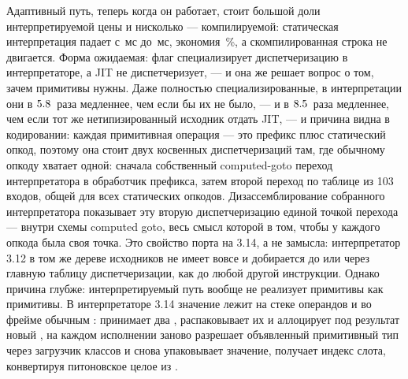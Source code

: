 Адаптивный путь, теперь когда он работает, стоит большой доли интерпретируемой цены и нисколько ---
компилируемой: статическая интерпретация падает с \,мс до \,мс, экономия \,\%, а
скомпилированная строка не двигается. Форма ожидаемая: флаг специализирует
диспетчеризацию в интерпретаторе, а JIT не диспетчеризует, --- и она же решает вопрос о том, зачем
примитивы нужны. Даже полностью специализированные, в интерпретации они в $\meas{ratio:b6_static-fork_static_adaptive:matmul96_int/fork_static_adaptive/static_interp|b6_static-fork_static_adaptive:matmul96_int/fork_static_adaptive/boxed_python}{5.8}$~раза медленнее,
чем если бы их не было, --- и в $\meas{ratio:b6_static-fork_static_adaptive:matmul96_int/fork_static_adaptive/static_interp|b6_static-fork_static_adaptive:matmul96_int/fork_static_adaptive/boxed_jit}{8.5}$~раза медленнее, чем если тот же нетипизированный исходник
отдать JIT, --- и причина видна в кодировании: каждая примитивная операция --- это префикс
 плюс статический опкод, поэтому она стоит двух косвенных диспетчеризаций
там, где обычному опкоду хватает одной: сначала собственный computed-goto переход интерпретатора в
обработчик префикса, затем второй переход по таблице из 103 входов, общей для всех статических
опкодов. Дизассемблирование собранного интерпретатора показывает эту вторую диспетчеризацию единой
точкой перехода --- внутри схемы computed goto, весь смысл которой в том, чтобы у каждого опкода
была своя точка. Это свойство порта на 3.14, а не замысла: интерпретатор 3.12 в том же дереве
исходников не имеет  вовсе и добирается до  или
 через главную таблицу диспетчеризации, как до любой другой инструкции.
Однако причина глубже: интерпретируемый путь вообще не реализует примитивы как примитивы. В
интерпретаторе 3.14 значение  лежит на стеке операндов и во фрейме обычным
:  принимает два , распаковывает их и
аллоцирует под результат новый ,  на каждом исполнении заново
разрешает объявленный примитивный тип через загрузчик классов и снова упаковывает значение,
 получает индекс слота, конвертируя питоновское целое из .
